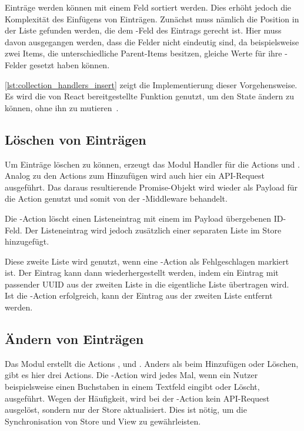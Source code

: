 Einträge werden können mit einem Feld  sortiert werden.  Dies erhöht
jedoch die Komplexität des Einfügens von Einträgen.  Zunächst muss nämlich die
Position in der Liste gefunden werden, die dem -Feld des Eintrags
gerecht ist.  Hier muss davon ausgegangen werden, dass die Felder nicht
eindeutig sind, da beispielsweise zwei Items, die unterschiedliche Parent-Items
besitzen, gleiche Werte für ihre -Felder gesetzt haben können.

\cref{lst:collection_handlers_insert} zeigt die Implementierung dieser
Vorgehensweise.  Es wird die von React bereitgestellte Funktion 
genutzt, um den State ändern zu können, ohne ihn zu mutieren~\cite{update}.



\subsection{Löschen von Einträgen}
\label{ssec:fc_aendern_von_eintraegen}

Um Einträge löschen zu können, erzeugt das Modul Handler für die Actions
 und .
Analog zu den Actions zum Hinzufügen wird auch hier ein API-Request ausgeführt.
Das daraus resultierende Promise-Objekt wird wieder als Payload für die Action
genutzt und somit von der -Middleware behandelt.

Die -Action löscht einen Listeneintrag mit einem im Payload
übergebenen ID-Feld.  Der Listeneintrag wird jedoch zusätzlich einer separaten
Liste im Store hinzugefügt.

Diese zweite Liste wird genutzt, wenn eine -Action als
Fehlgeschlagen markiert ist.  Der Eintrag kann dann wiederhergestellt werden,
indem ein Eintrag mit passender UUID aus der zweiten Liste in die eigentliche
Liste übertragen wird.  Ist die -Action erfolgreich, kann der
Eintrag aus der zweiten Liste entfernt werden.

\subsection{Ändern von Einträgen}
\label{ssec:fc_aendern_von_eintraegen}

Das Modul erstellt die Actions ,
 und .
Anders als beim Hinzufügen oder Löschen, gibt es hier drei Actions.  Die
-Action wird jedes Mal, wenn ein Nutzer beispielsweise einen
Buchstaben in einem Textfeld eingibt oder Löscht, ausgeführt.  Wegen der
Häufigkeit, wird bei der -Action kein API-Request ausgelöst,
sondern nur der Store aktualisiert.  Dies ist nötig, um die Synchronisation von
Store und View zu gewährleisten.

